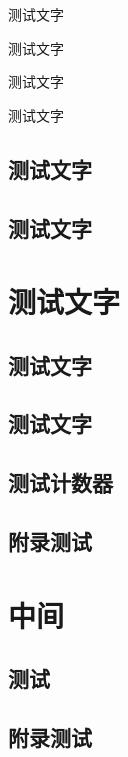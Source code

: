 \Thinking
\begin{QuestionItem}
	\item 测试文字
	\item 测试文字
	\item 测试文字
	\item 测试文字
\end{QuestionItem}






\section{测试文字}

\section{测试文字}


\chapter{测试文字}

\section{测试文字}

\section{测试文字}



\begin{Appendix}
	
\chapter{测试计数器}
	
\section{附录测试}
	
\end{Appendix}

\chapter{中间}

\begin{Appendix}

\chapter{测试}
	
\section{附录测试}
	
\end{Appendix}






